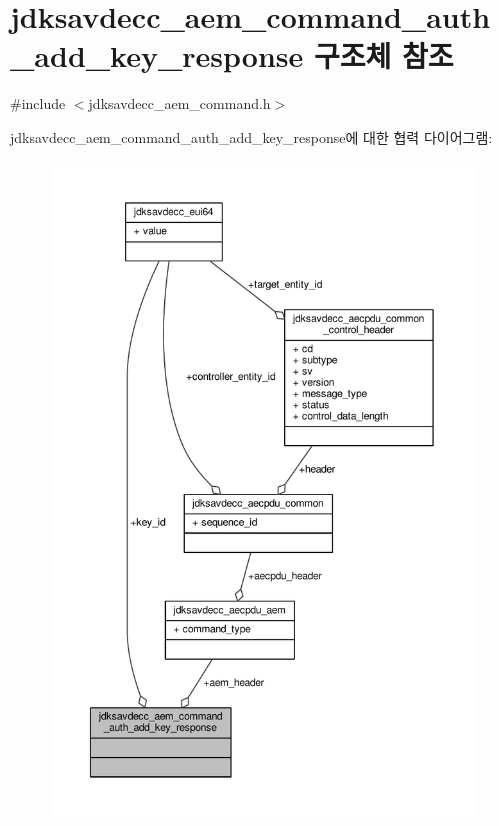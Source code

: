 \hypertarget{structjdksavdecc__aem__command__auth__add__key__response}{}\section{jdksavdecc\+\_\+aem\+\_\+command\+\_\+auth\+\_\+add\+\_\+key\+\_\+response 구조체 참조}
\label{structjdksavdecc__aem__command__auth__add__key__response}


{\ttfamily \#include $<$jdksavdecc\+\_\+aem\+\_\+command.\+h$>$}



jdksavdecc\+\_\+aem\+\_\+command\+\_\+auth\+\_\+add\+\_\+key\+\_\+response에 대한 협력 다이어그램\+:
\nopagebreak
\begin{figure}[H]
\begin{center}
\leavevmode
\includegraphics[width=350pt]{structjdksavdecc__aem__command__auth__add__key__response__coll__graph}
\end{center}
\end{figure}
